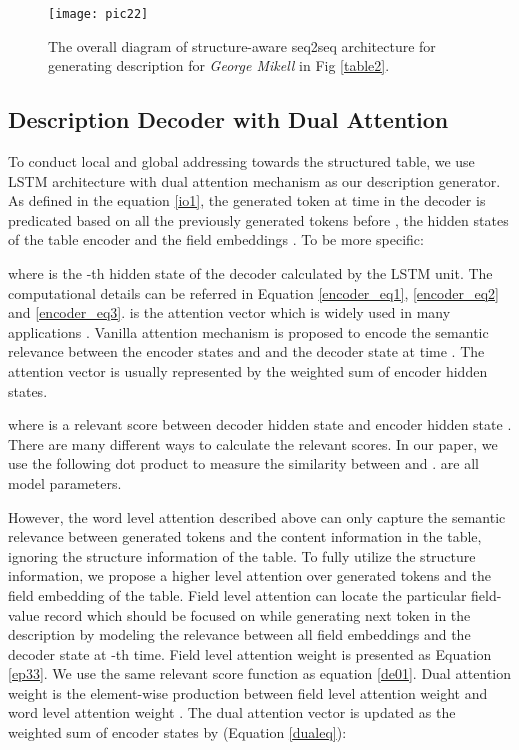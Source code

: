 \documentclass[letterpaper]{article} \usepackage{aaai18}  \usepackage{times}  \usepackage{helvet}  \usepackage{courier}  \usepackage{url}  \usepackage{graphicx}  \frenchspacing  \setlength{\pdfpagewidth}{8.5in}  \setlength{\pdfpageheight}{11in}  \usepackage{amsmath}
\begin{document}
\begin{figure*}[]
\centering
\texttt{[image: pic22]}
\caption{The overall diagram of structure-aware seq2seq architecture for generating description for \textit{George Mikell} in Fig \ref{table2}.}\label{mmodel}
\end{figure*}

\subsection{Description Decoder with Dual Attention}
To conduct local and global addressing towards the structured table, we use LSTM architecture with dual attention mechanism as our description generator. As defined in the equation \ref{io1}, the generated token   at time  in the decoder is predicated based on all the previously generated tokens  before , the hidden states  of the table encoder and the field embeddings . To be more specific:




where  is the -th hidden state of the decoder calculated by the LSTM unit. The computational details can be referred in Equation \ref{encoder_eq1}, \ref{encoder_eq2} and \ref{encoder_eq3}.  is the attention vector which is widely used in many applications \cite{xu2015show,luong2014addressing,DBLP:conf/acl/MaSXWLS17}. 
Vanilla attention mechanism is proposed to encode the semantic relevance between the encoder states  and and the decoder state  at time . The attention vector is usually represented by the weighted sum of encoder hidden states.

where  is a relevant score between decoder hidden state  and encoder hidden state . There are many different ways to calculate the relevant scores. In our paper, we use the following dot product to measure the similarity between  and .  are all model parameters. 


However, the word level attention described above can only capture the semantic relevance between generated tokens and the content information in the table, ignoring the structure information of the table. To fully utilize the structure information, we propose a higher level attention over generated tokens and the field embedding of the table. 
Field level attention can locate the particular field-value record which
should be focused on while generating next token in the description  by modeling the relevance between all field embeddings  and the decoder state  at -th time. 
Field level attention weight  is presented as Equation \ref{ep33}.
We use the same relevant score function  as equation \ref{de01}. 
Dual attention weight  is the element-wise production between field level attention weight  and word level attention weight . The dual attention vector  is updated as the weighted sum of encoder states  by  (Equation \ref{dualeq}):
\end{document}
